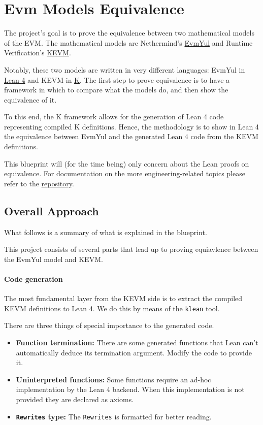\chapter*{Evm Models Equivalence}\label{evm-equiv-intro}

The project's goal is to prove the equivalence between two mathematical models of the EVM.
The mathematical models are Nethermind's \href{https://github.com/nethermindEth/EVMYulLean/}{EvmYul}
and Runtime Verification's \href{https://github.com/runtimeverification/evm-semantics}{KEVM}.

Notably, these two models are written in very different languages: EvmYul in
\href{https://lean-lang.org}{Lean 4} and KEVM in \href{https://kframework.org}{K}.
The first step to prove equivalence is to have a framework in which to compare
what the models do, and then show the equivalence of it.

To this end, the K framework allows for the generation of Lean 4 code
representing compiled K definitions.
Hence, the methodology is to show in Lean 4 the equivalence between EvmYul and
the generated Lean 4 code from the KEVM definitions.

This blueprint will (for the time being) only concern about the Lean proofs on
equivalence. For documentation on the more engineering-related topics please
refer to the
\href{https://github.com/runtimeverification/evm-equivalence}{repository}.

\section*{Overall Approach}

What follows is a summary of what is explained in the blueprint.

This project consists of several parts that lead up to proving equiavlence
between the EvmYul model and KEVM.

\subsubsection*{Code generation}

The most fundamental layer from the KEVM side is to extract the compiled KEVM
definitions to Lean 4. We do this by means of the \texttt{klean} tool.

There are three things of special importance to the generated code.

\begin{itemize}
\item \textbf{Function termination:} There are some generated functions that
  Lean can't automatically deduce its termination argument. Modify the code to
  provide it.
\item \textbf{Uninterpreted functions:} Some functions require an ad-hoc
  implementation by the Lean 4 backend. When this implementation is not provided
  they are declared as axioms.
\item \textbf{\texttt{Rewrites} type:} The \texttt{Rewrites} is formatted for
  better reading.
\end{itemize}

